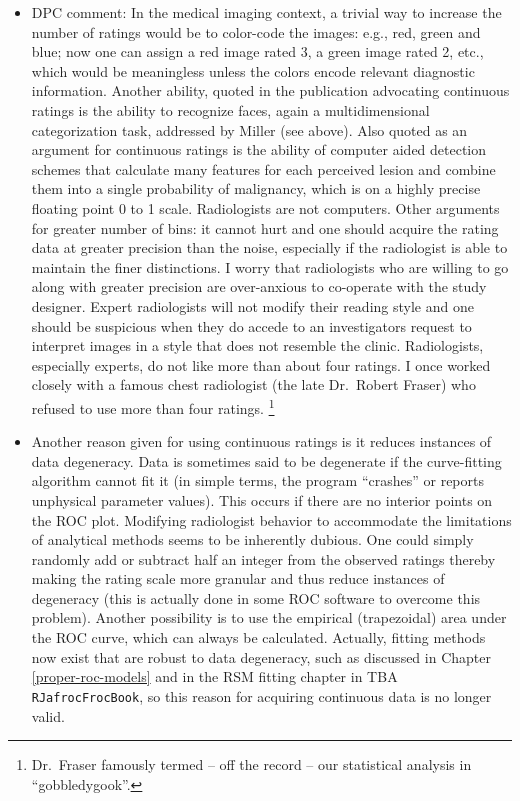 \documentclass[
]{book}
\begin{document}
\begin{itemize}
\item
  DPC comment: In the medical imaging context, a trivial way to increase the number of ratings would be to color-code the images: e.g., red, green and blue; now one can assign a red image rated 3, a green image rated 2, etc., which would be meaningless unless the colors encode relevant diagnostic information. Another ability, quoted in the publication \citep{wagner2001continuous} advocating continuous ratings is the ability to recognize faces, again a multidimensional categorization task, addressed by Miller (see above). Also quoted as an argument for continuous ratings is the ability of computer aided detection schemes that calculate many features for each perceived lesion and combine them into a single probability of malignancy, which is on a highly precise floating point 0 to 1 scale. Radiologists are not computers. Other arguments for greater number of bins: it cannot hurt and one should acquire the rating data at greater precision than the noise, especially if the radiologist is able to maintain the finer distinctions. I worry that radiologists who are willing to go along with greater precision are over-anxious to co-operate with the study designer. Expert radiologists will not modify their reading style and one should be suspicious when they do accede to an investigators request to interpret images in a style that does not resemble the clinic. Radiologists, especially experts, do not like more than about four ratings. I once worked closely with a famous chest radiologist (the late Dr.~Robert Fraser) who refused to use more than four ratings. \footnote{Dr.~Fraser famously termed -- off the record -- our statistical analysis in \citep{Chakraborty1986DigitalVsConv} ``gobbledygook''.}
\item
  Another reason given for using continuous ratings is it reduces instances of data degeneracy. Data is sometimes said to be degenerate if the curve-fitting algorithm cannot fit it (in simple terms, the program ``crashes'' or reports unphysical parameter values). This occurs if there are no interior points on the ROC plot. Modifying radiologist behavior to accommodate the limitations of analytical methods seems to be inherently dubious. One could simply randomly add or subtract half an integer from the observed ratings thereby making the rating scale more granular and thus reduce instances of degeneracy (this is actually done in some ROC software to overcome this problem). Another possibility is to use the empirical (trapezoidal) area under the ROC curve, which can always be calculated. Actually, fitting methods now exist that are robust to data degeneracy, such as discussed in Chapter \ref{proper-roc-models} and in the RSM fitting chapter in TBA \texttt{RJafrocFrocBook}, so this reason for acquiring continuous data is no longer valid.

\end{itemize}
\end{document}
